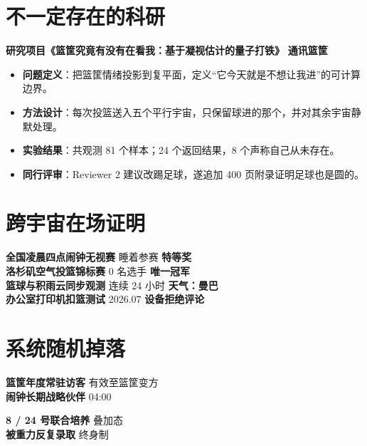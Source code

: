 \documentclass[11pt]{article}
\newlength{\iconwidth}
\begin{document}
    \begin{minipage}[t]{\textwidth}
    \section[不一定存在的科研]{\makebox[\iconwidth][c]{\color{primary_color}{\faAtom}}\quad 不一定存在的科研}

    \textbf{研究项目《篮筐究竟有没有在看我：基于凝视估计的量子打铁》}
    \hfill \textbf{通讯篮筐}
    \begin{itemize}
        \item \textbf{问题定义}：把篮筐情绪投影到复平面，定义“它今天就是不想让我进”的可计算边界。
        \item \textbf{方法设计}：每次投篮送入五个平行宇宙，只保留球进的那个，并对其余宇宙静默处理。
        \item \textbf{实验结果}：共观测 81 个样本；24 个返回结果，8 个声称自己从未存在。
        \item \textbf{同行评审}：Reviewer 2 建议改踢足球，遂追加 400 页附录证明足球也是圆的。
    \end{itemize}
    \vspace{0.35em}
    \end{minipage}

    \begin{minipage}[t]{\textwidth}
    \section[跨宇宙在场证明]{\makebox[\iconwidth][c]{\color{primary_color}{\faTrophy}}\quad 跨宇宙在场证明}
    \textbf{全国凌晨四点闹钟无视赛} \hfill 睡着参赛 \quad \textbf{特等奖}\\[0.2em]
    \textbf{洛杉矶空气投篮锦标赛} \hfill 0 名选手 \quad \textbf{唯一冠军}\\[0.2em]
    \textbf{篮球与积雨云同步观测} \hfill 连续 24 小时 \quad \textbf{天气：曼巴}\\[0.2em]
    \textbf{办公室打印机扣篮测试} \hfill 2026.07 \quad \textbf{设备拒绝评论}
    \vspace{0.35em}
    \end{minipage}

    \begin{minipage}[t]{\textwidth}
    \section[系统随机掉落]{\makebox[\iconwidth][c]{\color{primary_color}{\faMedal}}\quad 系统随机掉落}
    \begin{minipage}[t]{0.48\textwidth}
        \textbf{篮筐年度常驻访客} \hfill 有效至篮筐变方\\[0.2em]
        \textbf{闹钟长期战略伙伴} \hfill 04:00
    \end{minipage}
    \hfill
    \begin{minipage}[t]{0.48\textwidth}
        \textbf{8 / 24 号联合培养} \hfill 叠加态\\[0.2em]
        \textbf{被重力反复录取} \hfill 终身制
    \end{minipage}
    \vspace{0.9em}
    \end{minipage}
\end{document}
